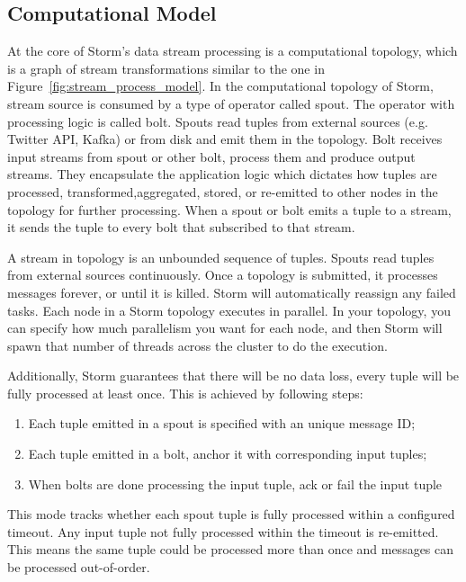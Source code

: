 \subsection{Computational Model}

At the core of Storm's data stream processing is a computational topology,  which is a graph of stream transformations similar to the one in Figure~\ref{fig:stream_process_model}. In the computational topology of Storm, stream source is consumed by a type of operator called spout. The operator with processing logic is called bolt. Spouts read tuples from external sources (e.g. Twitter API, Kafka) or from disk and emit them in the topology. Bolt receives input streams from spout or other bolt, process them and produce output streams. They encapsulate the application logic which dictates how tuples are processed, transformed,aggregated, stored, or re-emitted to other nodes in the topology for further processing. When a spout or bolt emits a tuple to a stream, it sends the tuple to every bolt that subscribed to that stream.

A stream in topology is an unbounded sequence of tuples. Spouts read tuples from external sources continuously. Once a topology is submitted, it processes messages forever, or until it is killed. Storm will automatically reassign any failed tasks. Each node in a Storm topology executes in parallel. In your topology, you can specify how much parallelism you want for each node, and then Storm will spawn that number of threads across the cluster to do the execution. 

Additionally, Storm guarantees that there will be no data loss, every tuple will be fully processed at least once. This is achieved by following steps:

\begin{enumerate}
\item Each tuple emitted in a spout is specified with an unique message ID;
\item Each tuple emitted in a bolt, anchor it with corresponding input tuples; 
\item When bolts are done processing the input tuple, ack or fail the input tuple
\end{enumerate}

This mode tracks whether each spout tuple is fully processed within a configured timeout. Any input tuple not fully processed within the timeout is re-emitted. This means the same tuple could be processed more than once and messages can be processed out-of-order. 


